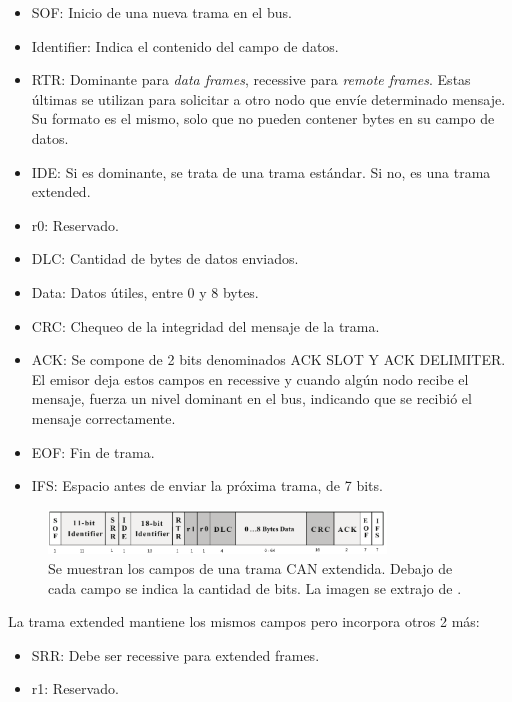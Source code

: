 \begin{itemize}
    \item SOF: Inicio de una nueva trama en el bus.
    \item Identifier: Indica el contenido del campo de datos.
    \item RTR: Dominante para \textit{data frames}, recessive para \textit{remote frames}. Estas últimas se utilizan para solicitar a otro nodo que envíe determinado mensaje. Su formato es el mismo, solo que no pueden contener bytes en su campo de datos.
    \item IDE: Si es dominante, se trata de una trama estándar. Si no, es una trama extended.
    \item r0: Reservado.
    \item DLC: Cantidad de bytes de datos enviados.
    \item Data: Datos útiles, entre 0 y 8 bytes.
    \item CRC: Chequeo de la integridad del mensaje de la trama.
    \item ACK: Se compone de 2 bits denominados ACK SLOT Y ACK DELIMITER. El emisor deja estos campos en recessive y cuando algún nodo recibe el mensaje, fuerza un nivel dominant en el bus, indicando que se recibió el mensaje correctamente.
    \item EOF: Fin de trama.
    \item IFS: Espacio antes de enviar la próxima trama, de 7 bits. 
\end{itemize}

\begin{figure}[htb]
    \centering
    \includegraphics[width=0.8\textwidth]{img/CAN_frame_extended.png}
    \caption{Se muestran los campos de una trama CAN extendida. Debajo de cada campo se indica la cantidad de bits. La imagen se extrajo de \cite{texasSLOA101B}.}
    \label{fig:CAN_frame_extended}
\end{figure}

La trama extended mantiene los mismos campos pero incorpora otros 2 más:

\begin{itemize}
    \item SRR: Debe ser recessive para extended frames.
    \item r1: Reservado.
\end{itemize}


